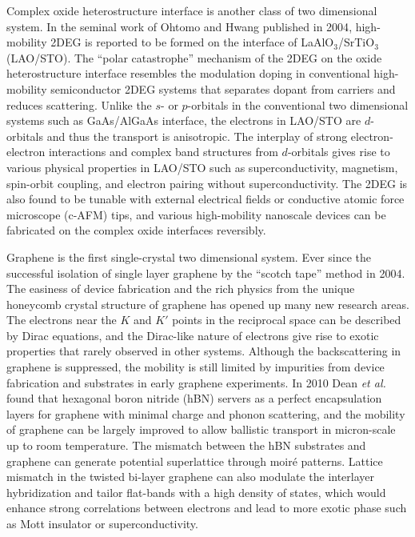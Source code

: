 \documentclass[pdflatex, sectionletters, 12pt]{pittetd}    %
\begin{document}
Complex oxide heterostructure interface is another class of two dimensional system. In the seminal work of Ohtomo and Hwang published in 2004\cite{ohtomo2004high}, high-mobility 2DEG is reported to be formed on the interface of LaAlO$_3$/SrTiO$_3$ (LAO/STO). The ``polar catastrophe'' mechanism\cite{nakagawa2006some} of the 2DEG on the oxide heterostructure interface resembles the modulation doping in conventional high-mobility semiconductor 2DEG systems that separates dopant from carriers and reduces scattering\cite{bogorin2010laalo3}. Unlike the $s$- or $p$-orbitals in the conventional two dimensional systems such as GaAs/AlGaAs interface, the electrons in LAO/STO are $d$-orbitals\cite{salluzzo2009orbital} and thus the transport is anisotropic\cite{annadi2013anisotropic}. The interplay of strong electron-electron interactions\cite{hwang2012emergent} and complex band structures from $d$-orbitals\cite{salluzzo2009orbital} gives rise to various physical properties in LAO/STO such as superconductivity\cite{reyren2007superconducting}, magnetism\cite{brinkman2007magnetic}, spin-orbit coupling\cite{caviglia2010tunable}, and electron pairing without superconductivity\cite{cheng2015electron}. The 2DEG is also found to be tunable with external electrical fields\cite{thiel2006tunable} or conductive atomic force microscope (c-AFM) tips\cite{cen2008nanoscale}, and various high-mobility nanoscale devices can be fabricated on the complex oxide interfaces reversibly\cite{cen2009oxide, irvin2010rewritable, cheng2011sketched, jnawali2015photoconductive, tomczyk2016micrometer, jiang2017direct, chen2019over}.

Graphene is the first single-crystal two dimensional system. Ever since the successful isolation of single layer graphene by the ``scotch tape'' method in 2004\cite{novoselov2004electric}. The easiness of device fabrication and the rich physics from the unique honeycomb crystal structure of graphene has opened up many new research areas. The electrons near the $K$ and $K'$ points in the reciprocal space can be described by Dirac equations\cite{wallace1947band, neto2009electronic}, and the Dirac-like nature of electrons\cite{novoselov2004electric, zhang2005experimental} give rise to exotic properties that rarely observed in other systems. Although the backscattering in graphene is suppressed\cite{ando1998berry}, the mobility is still limited by impurities from device fabrication and substrates in early graphene experiments. In 2010 Dean \textit{et al.} found that hexagonal boron nitride (hBN) servers as a perfect encapsulation layers for graphene with minimal charge and phonon scattering\cite{dean2010naturenano}, and the mobility of graphene can be largely improved to allow ballistic transport in micron-scale up to room temperature\cite{mayorov2011micrometer}. The mismatch between the hBN substrates and graphene can generate potential superlattice through moir{\'e} patterns. Lattice mismatch in the twisted bi-layer graphene can also modulate the interlayer hybridization and tailor flat-bands with a high density of states, which would enhance strong correlations between electrons and lead to more exotic phase such as Mott insulator\cite{cao2016superlattice, cao2018correlated, chen2018gate} or superconductivity\cite{cao2018unconventional}.
\end{document}
